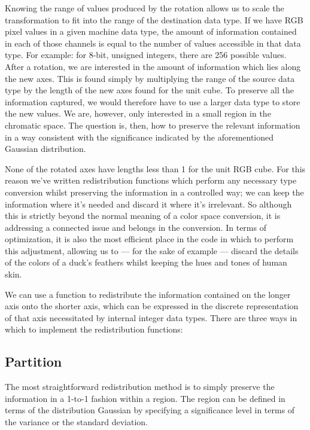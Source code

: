 Knowing the range of values produced by the rotation allows us to scale the transformation to fit into the range of the destination data type. If we have RGB pixel values in a given machine data type, the amount of information contained in each of those channels is equal to the number of values accessible in that data type. For example: for 8-bit, unsigned integers, there are 256 possible values. After a rotation, we are interested in the amount of information which lies along the new axes. This is found simply by multiplying the range of the source data type by the length of the new axes found for the unit cube. To preserve all the information captured, we would therefore have to use a larger data type to store the new values. We are, however, only interested in a small region in the chromatic space. The question is, then, how to preserve the relevant information in a way consistent with the significance indicated by the aforementioned Gaussian distribution.


None of the rotated axes have lengths less than 1 for the unit RGB cube. For this reason we've written redistribution functions which perform any necessary type conversion whilst preserving the information in a controlled way; we can keep the information where it's needed and discard it where it's irrelevant. So although this is strictly beyond the normal meaning of a color space conversion, it is addressing a connected issue and belongs in the conversion. In terms of optimization, it is also the most efficient place in the code in which to perform this adjustment, allowing us to --- for the sake of example --- discard the details of the colors of a duck's feathers whilst keeping the hues and tones of human skin.

We can use a function to redistribute the information contained on the longer axis onto the shorter axis, which can be expressed in the discrete representation of that axis necessitated by internal integer data types. There are three ways in which to implement the redistribution functions:

\subsection{Partition}\label{sec:Partition}

The most straightforward redistribution method is to simply preserve the information in a 1-to-1 fashion within a region. The region can be defined in terms of the distribution Gaussian by specifying a significance level in terms of the variance or the standard deviation.

